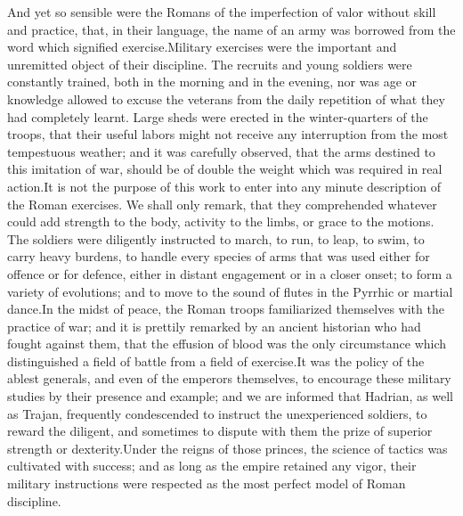 

And yet so sensible were the Romans of the imperfection of valor
without skill and practice, that, in their language, the name of
an army was borrowed from the word which signified exercise.\footnotemark[36]
Military exercises were the important and unremitted object of
their discipline. The recruits and young soldiers were constantly
trained, both in the morning and in the evening, nor was age or
knowledge allowed to excuse the veterans from the daily
repetition of what they had completely learnt. Large sheds were
erected in the winter-quarters of the troops, that their useful
labors might not receive any interruption from the most
tempestuous weather; and it was carefully observed, that the arms
destined to this imitation of war, should be of double the weight
which was required in real action.\footnotemark[37] It is not the purpose of
this work to enter into any minute description of the Roman
exercises. We shall only remark, that they comprehended whatever
could add strength to the body, activity to the limbs, or grace
to the motions. The soldiers were diligently instructed to march,
to run, to leap, to swim, to carry heavy burdens, to handle every
species of arms that was used either for offence or for defence,
either in distant engagement or in a closer onset; to form a
variety of evolutions; and to move to the sound of flutes in the
Pyrrhic or martial dance.\footnotemark[38] In the midst of peace, the Roman
troops familiarized themselves with the practice of war; and it
is prettily remarked by an ancient historian who had fought
against them, that the effusion of blood was the only
circumstance which distinguished a field of battle from a field
of exercise.\footnotemark[39] It was the policy of the ablest generals, and
even of the emperors themselves, to encourage these military
studies by their presence and example; and we are informed that
Hadrian, as well as Trajan, frequently condescended to instruct
the unexperienced soldiers, to reward the diligent, and sometimes
to dispute with them the prize of superior strength or dexterity.\footnotemark[40]
Under the reigns of those princes, the science of tactics was
cultivated with success; and as long as the empire retained any
vigor, their military instructions were respected as the most
perfect model of Roman discipline.

